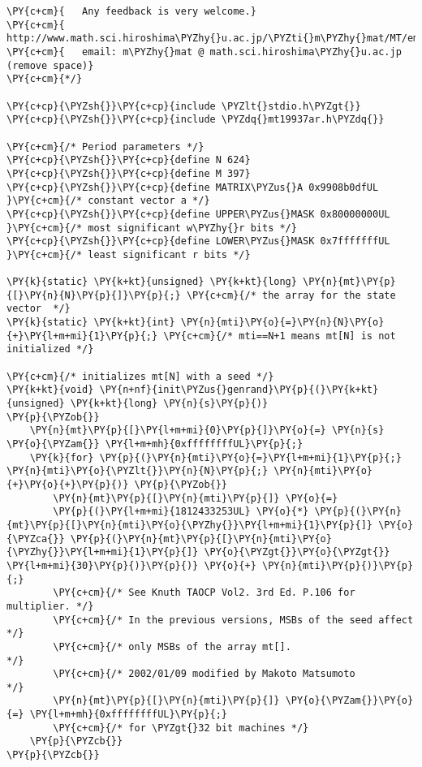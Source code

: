 \begin{Verbatim}[commandchars=\\\{\}]
\PY{c+cm}{   Any feedback is very welcome.}
\PY{c+cm}{   http://www.math.sci.hiroshima\PYZhy{}u.ac.jp/\PYZti{}m\PYZhy{}mat/MT/emt.html}
\PY{c+cm}{   email: m\PYZhy{}mat @ math.sci.hiroshima\PYZhy{}u.ac.jp (remove space)}
\PY{c+cm}{*/}

\PY{c+cp}{\PYZsh{}}\PY{c+cp}{include \PYZlt{}stdio.h\PYZgt{}}
\PY{c+cp}{\PYZsh{}}\PY{c+cp}{include \PYZdq{}mt19937ar.h\PYZdq{}}

\PY{c+cm}{/* Period parameters */}  
\PY{c+cp}{\PYZsh{}}\PY{c+cp}{define N 624}
\PY{c+cp}{\PYZsh{}}\PY{c+cp}{define M 397}
\PY{c+cp}{\PYZsh{}}\PY{c+cp}{define MATRIX\PYZus{}A 0x9908b0dfUL   }\PY{c+cm}{/* constant vector a */}
\PY{c+cp}{\PYZsh{}}\PY{c+cp}{define UPPER\PYZus{}MASK 0x80000000UL }\PY{c+cm}{/* most significant w\PYZhy{}r bits */}
\PY{c+cp}{\PYZsh{}}\PY{c+cp}{define LOWER\PYZus{}MASK 0x7fffffffUL }\PY{c+cm}{/* least significant r bits */}

\PY{k}{static} \PY{k+kt}{unsigned} \PY{k+kt}{long} \PY{n}{mt}\PY{p}{[}\PY{n}{N}\PY{p}{]}\PY{p}{;} \PY{c+cm}{/* the array for the state vector  */}
\PY{k}{static} \PY{k+kt}{int} \PY{n}{mti}\PY{o}{=}\PY{n}{N}\PY{o}{+}\PY{l+m+mi}{1}\PY{p}{;} \PY{c+cm}{/* mti==N+1 means mt[N] is not initialized */}

\PY{c+cm}{/* initializes mt[N] with a seed */}
\PY{k+kt}{void} \PY{n+nf}{init\PYZus{}genrand}\PY{p}{(}\PY{k+kt}{unsigned} \PY{k+kt}{long} \PY{n}{s}\PY{p}{)}
\PY{p}{\PYZob{}}
    \PY{n}{mt}\PY{p}{[}\PY{l+m+mi}{0}\PY{p}{]}\PY{o}{=} \PY{n}{s} \PY{o}{\PYZam{}} \PY{l+m+mh}{0xffffffffUL}\PY{p}{;}
    \PY{k}{for} \PY{p}{(}\PY{n}{mti}\PY{o}{=}\PY{l+m+mi}{1}\PY{p}{;} \PY{n}{mti}\PY{o}{\PYZlt{}}\PY{n}{N}\PY{p}{;} \PY{n}{mti}\PY{o}{+}\PY{o}{+}\PY{p}{)} \PY{p}{\PYZob{}}
        \PY{n}{mt}\PY{p}{[}\PY{n}{mti}\PY{p}{]} \PY{o}{=} 
	    \PY{p}{(}\PY{l+m+mi}{1812433253UL} \PY{o}{*} \PY{p}{(}\PY{n}{mt}\PY{p}{[}\PY{n}{mti}\PY{o}{\PYZhy{}}\PY{l+m+mi}{1}\PY{p}{]} \PY{o}{\PYZca{}} \PY{p}{(}\PY{n}{mt}\PY{p}{[}\PY{n}{mti}\PY{o}{\PYZhy{}}\PY{l+m+mi}{1}\PY{p}{]} \PY{o}{\PYZgt{}}\PY{o}{\PYZgt{}} \PY{l+m+mi}{30}\PY{p}{)}\PY{p}{)} \PY{o}{+} \PY{n}{mti}\PY{p}{)}\PY{p}{;} 
        \PY{c+cm}{/* See Knuth TAOCP Vol2. 3rd Ed. P.106 for multiplier. */}
        \PY{c+cm}{/* In the previous versions, MSBs of the seed affect   */}
        \PY{c+cm}{/* only MSBs of the array mt[].                        */}
        \PY{c+cm}{/* 2002/01/09 modified by Makoto Matsumoto             */}
        \PY{n}{mt}\PY{p}{[}\PY{n}{mti}\PY{p}{]} \PY{o}{\PYZam{}}\PY{o}{=} \PY{l+m+mh}{0xffffffffUL}\PY{p}{;}
        \PY{c+cm}{/* for \PYZgt{}32 bit machines */}
    \PY{p}{\PYZcb{}}
\PY{p}{\PYZcb{}}


\end{Verbatim}
